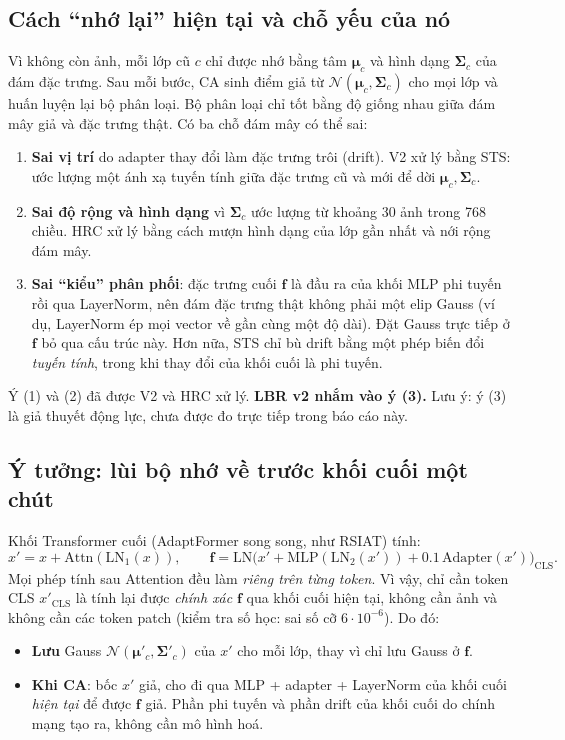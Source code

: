 \documentclass[11pt]{article}
\newcommand{\bmu}{\boldsymbol{\mu}}
\newcommand{\bSigma}{\boldsymbol{\Sigma}}
\newcommand{\vf}{\mathbf{f}}
\begin{document}
\subsection{Cách ``nhớ lại'' hiện tại và chỗ yếu của nó}
Vì không còn ảnh, mỗi lớp cũ $c$ chỉ được nhớ bằng tâm $\bmu_c$ và hình dạng $\bSigma_c$ của đám đặc trưng. Sau mỗi
bước, CA sinh điểm giả từ $\mathcal{N}(\bmu_c,\bSigma_c)$ cho mọi lớp và huấn luyện lại bộ phân loại. Bộ phân loại chỉ
tốt bằng độ giống nhau giữa đám mây giả và đặc trưng thật. Có ba chỗ đám mây có thể sai:
\begin{enumerate}
\item \textbf{Sai vị trí} do adapter thay đổi làm đặc trưng trôi (drift). V2 xử lý bằng STS: ước lượng một ánh xạ
      tuyến tính giữa đặc trưng cũ và mới để dời $\bmu_c,\bSigma_c$.
\item \textbf{Sai độ rộng và hình dạng} vì $\bSigma_c$ ước lượng từ khoảng 30 ảnh trong 768 chiều. HRC xử lý bằng
      cách mượn hình dạng của lớp gần nhất và nới rộng đám mây.
\item \textbf{Sai ``kiểu'' phân phối}: đặc trưng cuối $\vf$ là đầu ra của khối MLP phi tuyến rồi qua LayerNorm, nên
      đám đặc trưng thật không phải một elip Gauss (ví dụ, LayerNorm ép mọi vector về gần cùng một độ dài). Đặt Gauss
      trực tiếp ở $\vf$ bỏ qua cấu trúc này. Hơn nữa, STS chỉ bù drift bằng một phép biến đổi \emph{tuyến tính}, trong
      khi thay đổi của khối cuối là phi tuyến.
\end{enumerate}
Ý (1) và (2) đã được V2 và HRC xử lý. \textbf{LBR v2 nhắm vào ý (3).} Lưu ý: ý (3) là giả thuyết động lực, chưa được đo
trực tiếp trong báo cáo này.

\subsection{Ý tưởng: lùi bộ nhớ về trước khối cuối một chút}
Khối Transformer cuối (AdaptFormer song song, như RSIAT) tính:
\begin{equation}
x'=x+\mathrm{Attn}(\mathrm{LN}_1(x)),\qquad
\vf=\mathrm{LN}\big(x'+\mathrm{MLP}(\mathrm{LN}_2(x'))+0.1\,\mathrm{Adapter}(x')\big)_{\text{CLS}}.
\end{equation}
Mọi phép tính sau Attention đều làm \emph{riêng trên từng token}. Vì vậy, chỉ cần token CLS $x'_{\text{CLS}}$ là tính
lại được \emph{chính xác} $\vf$ qua khối cuối hiện tại, không cần ảnh và không cần các token patch (kiểm tra số học:
sai số cỡ $6\cdot10^{-6}$). Do đó:
\begin{itemize}
\item \textbf{Lưu} Gauss $\mathcal{N}(\bmu'_c,\bSigma'_c)$ của $x'$ cho mỗi lớp, thay vì chỉ lưu Gauss ở $\vf$.
\item \textbf{Khi CA}: bốc $x'$ giả, cho đi qua MLP + adapter + LayerNorm của khối cuối \emph{hiện tại} để được $\vf$
      giả. Phần phi tuyến và phần drift của khối cuối do chính mạng tạo ra, không cần mô hình hoá.
\end{itemize}
\end{document}
